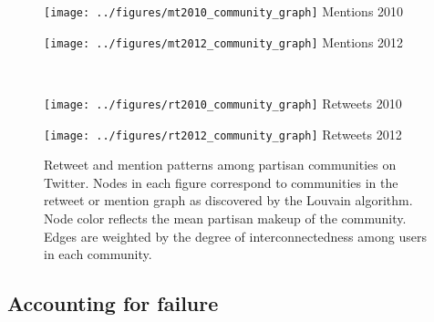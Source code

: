 \documentclass{article}
\begin{document}
\begin{figure*}[ht]
  \centering
  \begin{minipage}[h]{0.45\linewidth}
    \begin{center}
      \texttt{[image: ../figures/mt2010\_community\_graph]}
      Mentions 2010
    \end{center}

  \end{minipage}
  \begin{minipage}[h]{0.45\linewidth}
    \begin{center}
      \texttt{[image: ../figures/mt2012\_community\_graph]}
      Mentions 2012
    \end{center}
  \end{minipage}\\
  \begin{minipage}[h]{0.45\linewidth}
    \begin{center}
      \texttt{[image: ../figures/rt2010\_community\_graph]}
      Retweets 2010
    \end{center}
  \end{minipage}
  \begin{minipage}[h]{0.45\linewidth}
    \begin{center}
      \texttt{[image: ../figures/rt2012\_community\_graph]}
      Retweets 2012
    \end{center}
  \end{minipage}
\caption{Retweet and mention patterns among partisan communities on
  Twitter. Nodes in each figure correspond to communities in the
  retweet or mention graph as discovered by the Louvain
  algorithm. Node color reflects the mean partisan makeup of the
  community. Edges are weighted by the degree of interconnectedness
  among users in each community.}
\label{fig:partisan-graphs}
\end{figure*}



\subsection{Accounting for failure}
\label{sec:accounting-failure-1}
\end{document}
